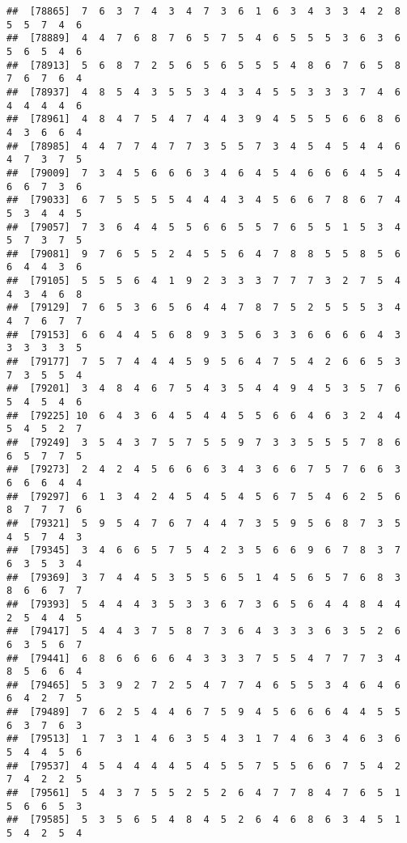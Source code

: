 \documentclass[
]{book}
\begin{document}
\begin{verbatim}
##  [78865]  7  6  3  7  4  3  4  7  3  6  1  6  3  4  3  3  4  2  8  5  5  7  4  6
##  [78889]  4  4  7  6  8  7  6  5  7  5  4  6  5  5  5  3  6  3  6  5  6  5  4  6
##  [78913]  5  6  8  7  2  5  6  5  6  5  5  5  4  8  6  7  6  5  8  7  6  7  6  4
##  [78937]  4  8  5  4  3  5  5  3  4  3  4  5  5  3  3  3  7  4  6  4  4  4  4  6
##  [78961]  4  8  4  7  5  4  7  4  4  3  9  4  5  5  5  6  6  8  6  4  3  6  6  4
##  [78985]  4  4  7  7  4  7  7  3  5  5  7  3  4  5  4  5  4  4  6  4  7  3  7  5
##  [79009]  7  3  4  5  6  6  6  3  4  6  4  5  4  6  6  6  4  5  4  6  6  7  3  6
##  [79033]  6  7  5  5  5  5  4  4  4  3  4  5  6  6  7  8  6  7  4  5  3  4  4  5
##  [79057]  7  3  6  4  4  5  5  6  6  5  5  7  6  5  5  1  5  3  4  5  7  3  7  5
##  [79081]  9  7  6  5  5  2  4  5  5  6  4  7  8  8  5  5  8  5  6  6  4  4  3  6
##  [79105]  5  5  5  6  4  1  9  2  3  3  3  7  7  7  3  2  7  5  4  4  3  4  6  8
##  [79129]  7  6  5  3  6  5  6  4  4  7  8  7  5  2  5  5  5  3  4  4  7  6  7  7
##  [79153]  6  6  4  4  5  6  8  9  3  5  6  3  3  6  6  6  6  4  3  3  3  3  3  5
##  [79177]  7  5  7  4  4  4  5  9  5  6  4  7  5  4  2  6  6  5  3  7  3  5  5  4
##  [79201]  3  4  8  4  6  7  5  4  3  5  4  4  9  4  5  3  5  7  6  5  4  5  4  6
##  [79225] 10  6  4  3  6  4  5  4  4  5  5  6  6  4  6  3  2  4  4  5  4  5  2  7
##  [79249]  3  5  4  3  7  5  7  5  5  9  7  3  3  5  5  5  7  8  6  6  5  7  7  5
##  [79273]  2  4  2  4  5  6  6  6  3  4  3  6  6  7  5  7  6  6  3  6  6  6  4  4
##  [79297]  6  1  3  4  2  4  5  4  5  4  5  6  7  5  4  6  2  5  6  8  7  7  7  6
##  [79321]  5  9  5  4  7  6  7  4  4  7  3  5  9  5  6  8  7  3  5  4  5  7  4  3
##  [79345]  3  4  6  6  5  7  5  4  2  3  5  6  6  9  6  7  8  3  7  6  3  5  3  4
##  [79369]  3  7  4  4  5  3  5  5  6  5  1  4  5  6  5  7  6  8  3  8  6  6  7  7
##  [79393]  5  4  4  4  3  5  3  3  6  7  3  6  5  6  4  4  8  4  4  2  5  4  4  5
##  [79417]  5  4  4  3  7  5  8  7  3  6  4  3  3  3  6  3  5  2  6  6  3  5  6  7
##  [79441]  6  8  6  6  6  6  4  3  3  3  7  5  5  4  7  7  7  3  4  8  5  6  6  4
##  [79465]  5  3  9  2  7  2  5  4  7  7  4  6  5  5  3  4  6  4  6  6  4  2  7  5
##  [79489]  7  6  2  5  4  4  6  7  5  9  4  5  6  6  6  4  4  5  5  6  3  7  6  3
##  [79513]  1  7  3  1  4  6  3  5  4  3  1  7  4  6  3  4  6  3  6  5  4  4  5  6
##  [79537]  4  5  4  4  4  4  5  4  5  5  7  5  5  6  6  7  5  4  2  7  4  2  2  5
##  [79561]  5  4  3  7  5  5  2  5  2  6  4  7  7  8  4  7  6  5  1  5  6  6  5  3
##  [79585]  5  3  5  6  5  4  8  4  5  2  6  4  6  8  6  3  4  5  1  5  4  2  5  4

\end{verbatim}
\end{document}
